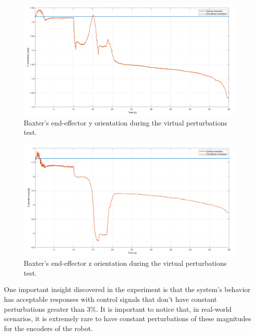 \documentclass[11pt]{report} %
\begin{document}
\begin{figure}[H]
    \centering
    \includegraphics[width=1.0\linewidth]{assets/imgs/control_theory/mpc_regulation_virtual_perturbations/y_orientation.png}
    \caption{Baxter's end-effector y orientation during the virtual perturbations test.} 
    \label{fig_baxter_y_orientation_mpc_virtual_perturbations_experiments}
\end{figure}

\begin{figure}[H]
    \centering
    \includegraphics[width=1.0\linewidth]{assets/imgs/control_theory/mpc_regulation_virtual_perturbations/z_orientation.png}
    \caption{Baxter's end-effector z orientation during the virtual perturbations test.} 
    \label{fig_baxter_z_orientation_mpc_perturbations_perturbations_experiments}
\end{figure}

One important insight discovered in the experiment is that the system's behavior has acceptable responses with control signals that don't have constant perturbations greater than 3\%. It is important to notice that, in real-world scenarios, it is extremely rare to have constant perturbations of these magnitudes for the encoders of the robot.\\
\end{document}
